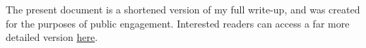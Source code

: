 \documentclass[a4paper, 11pt]{article}
\theoremstyle{plain}
\newtheorem{proposition}[theorem]{Proposition}
\theoremstyle{definition}
\newtheorem{definition}[theorem]{Definition}
\theoremstyle{remark}
\numberwithin{equation}{subsection}
\def\({}
\def\){}
\begin{document}
The present document is a shortened version of my full write-up, and was created for the purposes of public engagement. Interested readers can access a far more detailed version \href{https://arismercier.github.io/GMT_Notes/GMT_Notes.pdf}{here}.


\begin{comment}  
\section{Preliminaries}
\label{Preliminaries}

\subsection{Preliminaries from Measure Theory}

\subsubsection{Covering Theorems}

We begin by exploring a class of results known as \emph{covering theorems}. The main idea is as follows: starting from a family of covering sets, we wish to select a subfamily with some control on the overlap of the sets. In particular, the sets might be pairwise disjoint or almost disjoint (in the measure-theoretic sense). This may seem similar to the notion of compactness, which we now recall:

\begin{definition}
A topological space \(T\) is \emph{compact} if every open cover contains a finite subcover.
\end{definition}

A simple covering theorem is the following:

\begin{proposition}
Let \(A \subset \mathbb{R}^{n}\) be a bounded set, and fix \(r > 0\). Then there are finitely many elements \(x_{1},\ldots,x_{N}\) such that
\begin{equation}
A \subset \bigcup_{k=1}^{N}B_{r}(x_{k}),
\end{equation}
and every \(x \in A\) is contained in at most \(3^{n}\) of the balls \(B_{r}(x_{k})\).
\end{proposition}

Note that the first part of the proposition follows immediately by compactness,\footnote{Even if A is not compact, it is contained in a compact set.} so the essence of a covering result is controlling the overlap of the balls.


\end{comment}
\end{document}
